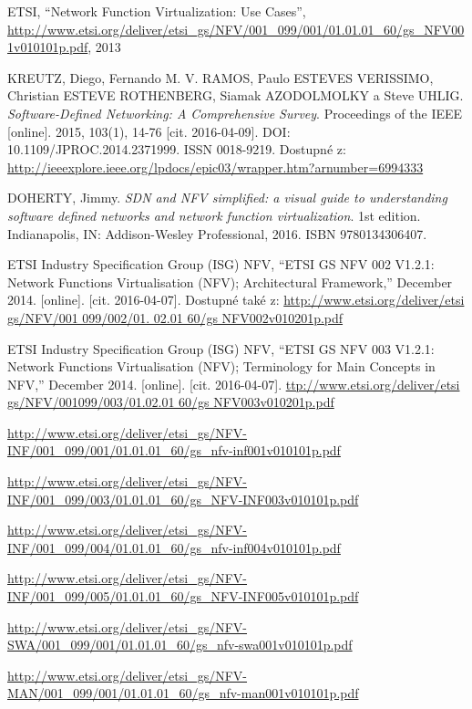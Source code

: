 \begin{thebibliography}{10}
ETSI, “Network Function Virtualization: Use Cases”, \url{http://www.etsi.org/deliver/etsi_gs/NFV/001_099/001/01.01.01_60/gs_NFV001v010101p.pdf}, 2013

KREUTZ, Diego, Fernando M. V. RAMOS, Paulo ESTEVES VERISSIMO, Christian ESTEVE ROTHENBERG, Siamak AZODOLMOLKY a Steve UHLIG. \emph{Software-Defined Networking: A Comprehensive Survey}. Proceedings of the IEEE [online]. 2015, 103(1), 14-76 [cit. 2016-04-09]. DOI: 10.1109/JPROC.2014.2371999. ISSN 0018-9219. Dostupné z: \url{http://ieeexplore.ieee.org/lpdocs/epic03/wrapper.htm?arnumber=6994333}

 DOHERTY, Jimmy. \emph{SDN and NFV simplified: a visual guide to understanding software defined networks and network function virtualization}. 1st edition. Indianapolis, IN: Addison-Wesley Professional, 2016. ISBN 9780134306407.

ETSI Industry Specification Group (ISG) NFV, “ETSI GS NFV 002 V1.2.1: Network Functions Virtualisation (NFV); Architectural Framework,” December 2014. [online]. [cit. 2016-04-07]. Dostupné také z: \url{http://www.etsi.org/deliver/etsi gs/NFV/001 099/002/01. 02.01 60/gs NFV002v010201p.pdf} 

ETSI Industry Specification Group (ISG) NFV, “ETSI GS NFV 003 V1.2.1: Network Functions Virtualisation (NFV); Terminology for Main Concepts in NFV,” December 2014. [online]. [cit. 2016-04-07]. \url{ttp://www.etsi.org/deliver/etsi gs/NFV/001099/003/01.02.01 60/gs NFV003v010201p.pdf}

\url{http://www.etsi.org/deliver/etsi_gs/NFV-INF/001_099/001/01.01.01_60/gs_nfv-inf001v010101p.pdf}

 \url{http://www.etsi.org/deliver/etsi_gs/NFV-INF/001_099/003/01.01.01_60/gs_NFV-INF003v010101p.pdf}

 \url{http://www.etsi.org/deliver/etsi_gs/NFV-INF/001_099/004/01.01.01_60/gs_nfv-inf004v010101p.pdf}

 \url{http://www.etsi.org/deliver/etsi_gs/NFV-INF/001_099/005/01.01.01_60/gs_NFV-INF005v010101p.pdf}

\url{http://www.etsi.org/deliver/etsi_gs/NFV-SWA/001_099/001/01.01.01_60/gs_nfv-swa001v010101p.pdf}

\url{http://www.etsi.org/deliver/etsi_gs/NFV-MAN/001_099/001/01.01.01_60/gs_nfv-man001v010101p.pdf}


\end{thebibliography}
